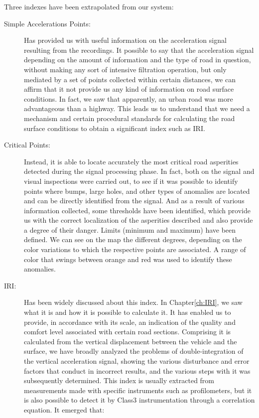 \documentclass[tesi]{subfiles}
\begin{document}
 Three indexes have been extrapolated from our system:
\begin{description}
\item[Simple Accelerations Points:] Has provided us with useful information on the acceleration signal resulting from the recordings. It possible to say that the acceleration signal depending on the amount of information and the type of road in question, without making any sort of intensive filtration operation, but only mediated by a set of points collected within certain distances, we can affirm that it not provide us any kind of information on road surface conditions. In fact, we saw that apparently, an urban road was more advantageous than a highway. This leads us to understand that we need a mechanism and certain procedural standards for calculating the road surface conditions to obtain a significant index such as IRI.
\item[Critical Points:] Instead, it is able to locate accurately the most critical road asperities detected during the signal processing phase. In fact, both on the signal and visual inspections were carried out, to see if it was possible to identify points where bumps, large holes, and other types of anomalies are located and can be directly identified from the signal. And as a result of various information collected, some thresholds have been identified, which provide us with the correct localization of the asperities described and also provide a degree of their danger. Limits (minimum and maximum) have been defined. We can see on the map the different degrees, depending on the color variations to which the respective points are associated. A range of color that swings between orange and red was used to identify these anomalies.
\clearpage
\item[IRI:] Has been widely discussed about this index. In Chapter\ref{ch:IRI}, we saw what it is and how it is possible to calculate it.
It has enabled us to provide, in accordance with its scale, an indication of the quality and comfort level associated with certain road sections. Comprising it is calculated from the vertical displacement between the vehicle and the surface, we have broadly analyzed the problems of double-integration of the vertical acceleration signal, showing the various disturbance and error factors that conduct in incorrect results, and the various steps with it was subsequently determined. This index is usually extracted from measurements made with specific instruments such as profilometers, but it is also possible to detect it by Class3 instrumentation through a correlation equation. It emerged that:

\end{description}
\end{document}
